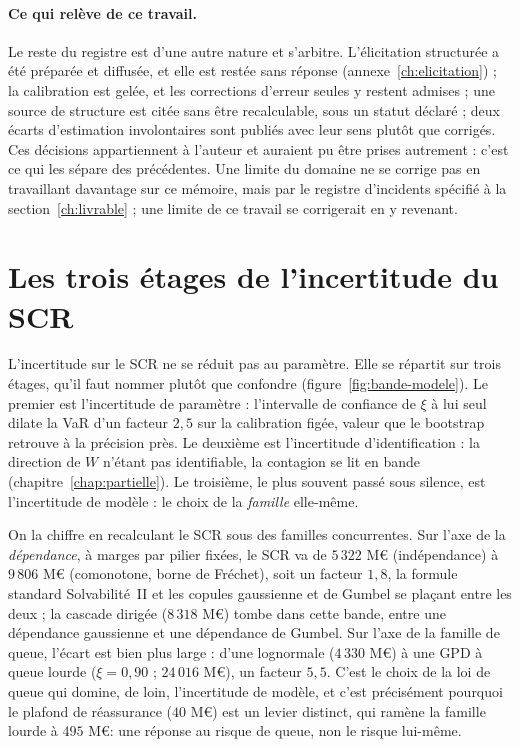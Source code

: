 \paragraph{Ce qui relève de ce travail.} Le reste du registre est d'une autre nature et
s'arbitre. L'élicitation structurée a été préparée et diffusée, et elle est restée sans réponse
(annexe~\ref{ch:elicitation}) ; la calibration est gelée, et les
corrections d'erreur seules y restent admises ; une source de structure est citée sans être
recalculable, sous un statut déclaré ; deux écarts d'estimation involontaires sont publiés avec
leur sens plutôt que corrigés. Ces décisions appartiennent à l'auteur et auraient pu être prises
autrement : c'est ce qui les sépare des précédentes. Une limite du domaine ne se corrige pas en
travaillant davantage sur ce mémoire, mais par le registre d'incidents spécifié à la
section~\ref{ch:livrable} ; une limite de ce travail se corrigerait en y revenant.

\section{Les trois étages de l'incertitude du SCR}

L'incertitude sur le SCR ne se réduit pas au paramètre. Elle se répartit sur trois étages, qu'il
faut nommer plutôt que confondre (figure~\ref{fig:bande-modele}). Le premier est l'incertitude
de paramètre : l'intervalle de confiance de $\xi$ à lui seul dilate la VaR d'un facteur
$2{,}5$ sur la calibration figée, valeur que le bootstrap retrouve à la précision près.
Le deuxième est l'incertitude d'identification :
la direction de $W$ n'étant pas identifiable, la contagion se lit en bande
(chapitre~\ref{chap:partielle}). Le troisième, le plus souvent passé sous silence, est
l'incertitude de modèle : le choix de la \emph{famille} elle-même.

On la chiffre en recalculant le SCR sous des familles concurrentes. Sur l'axe de la
\emph{dépendance}, à marges par pilier fixées, le SCR va de $5\,322$ M\euro{} (indépendance) à
$9\,806$ M\euro{} (comonotone, borne de Fréchet), soit un facteur $1{,}8$, la formule standard
Solvabilité~II et les copules gaussienne et de Gumbel se plaçant entre les deux ; la cascade
dirigée ($8\,318$ M\euro) tombe dans cette bande, entre une dépendance gaussienne et une
dépendance de Gumbel. Sur l'axe de la famille de queue, l'écart est bien plus large :
d'une lognormale ($4\,330$ M\euro) à une GPD à queue lourde ($\xi=0{,}90$ ; $24\,016$ M\euro),
un facteur $5{,}5$. C'est le choix de la loi de queue qui domine, de loin, l'incertitude de
modèle, et c'est précisément pourquoi le plafond de réassurance ($40$ M\euro) est un levier
distinct, qui ramène la famille lourde à $495$ M\euro : une réponse au risque de queue, non le
risque lui-même.


